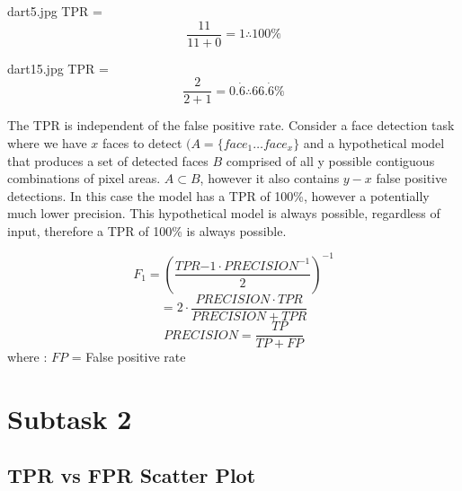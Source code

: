 \documentclass[conference]{IEEEtran}
\begin{document}
dart5.jpg TPR = 
\[\frac{11}{11+0} = 1 \therefore 100\%\]

dart15.jpg TPR = 
\[\frac{2}{2+1} = 0.\dot{6} \therefore 66.\dot{6}\%\]


The TPR is independent of the false positive rate. Consider a face detection task where we have $x$ faces to detect $(A = \{face_{1} \ldots face_{x}\}$ and a hypothetical model that produces a set of detected faces $B$ comprised of all y possible contiguous combinations of pixel areas. $A \subset B$, however it also contains $y-x$ false positive detections. In this case the model has a TPR of 100\%, however a potentially much lower precision. This hypothetical model is always possible, regardless of input, therefore a TPR of 100\% is always possible.



$$F_{1} = \left(\frac{TPR{-1} \cdot PRECISION^{-1}}{2} \right) ^{-1}$$
$$= 2 \cdot \frac{PRECISION \cdot TPR}{PRECISION + TPR}$$
$$ PRECISION = \frac{TP}{TP + FP}$$
where :
$FP$ = False positive rate

\newpage

\section{Subtask 2}

\subsection{TPR vs FPR Scatter Plot}

\begin{center}
\end{center}
\end{document}
